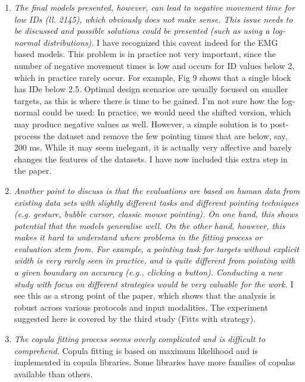 \documentclass{article}
\begin{document}
\begin{enumerate}
    \item \textit{The final models presented, however, can lead to negative movement time for low IDs (ll. 2145), which obviously does not make sense. This issue needs to be discussed and possible solutions could be presented (such as using a log-normal distributions). } I have recognized this caveat indeed for the EMG based models. This problem is in practice not very important, since the number of negative movement times is low and occurs for ID values below 2, which in practice rarely occur. For example, Fig 9 shows that a single block has IDe below 2.5. Optimal design scenarios are usually focused on smaller targets, as this is where there is time to be gained. I'm not sure how the log-normal could be used: In practice, we would need the shifted version, which may produce negative values as well. However, a simple solution is to post-process the dataset and remove the few pointing times that are below, say, 200 ms. While it may seem inelegant, it is actually very affective and barely changes the features of the datasets. I have now included this extra step in the paper.
    \item \textit{Another point to discuss is that the evaluations are based on human data from existing data sets with slightly different tasks and different pointing techniques (e.g. gesture, bubble cursor, classic mouse pointing). On one hand, this shows potential that the models generalise well. On the other hand, however, this makes it hard to understand where problems in the fitting process or evaluation stem from. For example, a pointing task for targets without explicit width is very rarely seen in practice, and is quite different from pointing with a given boundary on accuracy (e.g., clicking a button). Conducting a new study with focus on different strategies would be very valuable for the work. } I see this as a strong point of the paper, which shows that the analysis is robust across various protocols and input modalities. The experiment suggested here is covered by the third study (Fitts with strategy).
    \item \textit{The copula fitting process seems overly complicated and is difficult to comprehend. } Copula fitting is based on maximum likelihood and is implemented in copula libraries. Some libraries have more families of copulas available than others.

\end{enumerate}
\end{document}
